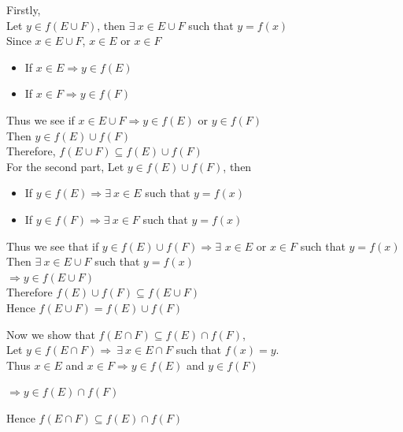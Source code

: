 \documentclass{article}
\begin{document}
Firstly, \\ 
Let \(y \in f(E \cup F)\), then \(\exists \ x \in E \cup F\) such that \(y = f(x)\) \\
Since \(x \in E \cup F\), \(x \in E\) or \(x \in F\) 
\begin{itemize}
    \item If \(x \in E \Rightarrow y \in f(E)\)
    \item If \(x \in F \Rightarrow y \in f(F)\)
\end{itemize}

Thus we see if \(x \in E \cup F \Rightarrow y \in f(E)\) or \(y \in f(F)\) \\
Then \(y \in f(E) \cup f(F)\) \\
Therefore, \(f(E \cup F) \subseteq f(E) \cup f(F)\)
\\

For the second part,
Let \(y \in f(E) \cup f(F)\), then
\begin{itemize}
    \item If \(y \in f(E) \Rightarrow \exists \ x \in E\) such that \(y = f(x)\)
    \item If \(y \in f(F) \Rightarrow \exists \ x \in F\) such that \(y = f(x)\)
\end{itemize}

Thus we see that if \(y \in f(E) \cup f(F) \Rightarrow \exists\) \(x \in E\) or \(x \in F\) such that \(y = f(x)\) \\
Then \(\exists \ x \in E \cup F\) such that \(y = f(x)\) \\
\(\Rightarrow y \in f(E \cup F)\) \\
Therefore \(f(E) \cup f(F) \subseteq f(E \cup F) \)
\\

Hence \(f(E \cup F) = f(E) \cup f(F)\)
\\

\vspace{7mm}

Now we show that \(f(E \cap F) \subseteq f(E) \cap f(F)\),
\\ 

Let \(y \in f(E\cap F) \Rightarrow \ \exists \ x \in E \cap F\)  such that \( f(x) = y\). 
\\
Thus \(x \in E \) and \( x \in F \Rightarrow y \in f(E)\) and \(y \in f(F)\)

\(\Rightarrow y \in f(E)\cap f(F)\)

Hence \(f(E \cap F) \subseteq f(E) \cap f(F)\)
\end{document}
